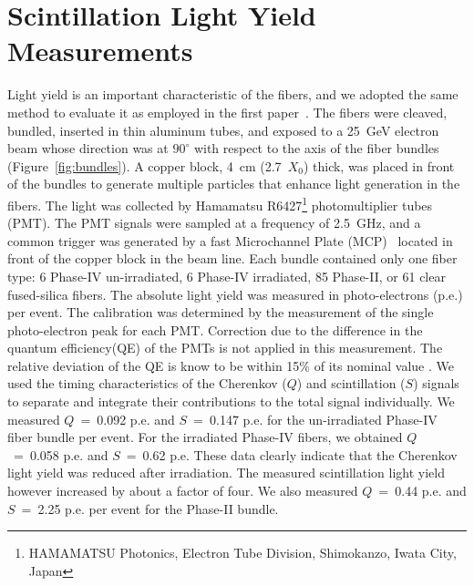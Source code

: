 \documentclass[a4paper,11pt]{article}
\begin{document}
\section{Scintillation Light Yield Measurements}
\label{sec:lightyield}
Light yield is an important characteristic of the fibers, and we adopted the same method to evaluate it as employed in the first paper~\cite{JINSTPaper}.   The fibers were cleaved, bundled, inserted in thin aluminum tubes, and exposed to a 25~GeV electron beam whose direction was at $90^{\circ}$ with respect to the axis of the fiber bundles (Figure~\ref{fig:bundles}). A copper block, 4~cm (2.7~$X_0$) thick, was placed in front of the bundles to generate multiple particles that enhance light generation in the fibers. The light was collected by Hamamatsu R6427\footnote{HAMAMATSU Photonics, Electron Tube Division, Shimokanzo, Iwata City, Japan} photomultiplier tubes (PMT). The PMT signals were sampled at a frequency of 2.5~GHz, and a common trigger was generated by a fast Microchannel Plate (MCP)~\cite{r-MCP} located in front of the copper block in the beam line. Each bundle contained only one fiber type: 6 Phase-IV un-irradiated, 6 Phase-IV irradiated, 85 Phase-II, or 61 clear fused-silica fibers. The absolute light yield was measured in photo-electrons (p.e.) per event. The calibration was determined by the measurement of the single photo-electron peak for each PMT. Correction due to the difference in the quantum efficiency(QE) of the PMTs is not applied in this measurement. The relative deviation of the QE is know to be within 15\% of its nominal value . We used the timing characteristics of the Cherenkov ($Q$) and scintillation ($S$) signals to separate and integrate their contributions to the total signal individually. We measured $Q$~=~0.092 p.e. and $S$~=~0.147 p.e. for the un-irradiated Phase-IV fiber bundle per event. For the irradiated Phase-IV fibers, we obtained $Q$~=~0.058 p.e. and $S$~=~0.62 p.e.  These data clearly indicate that the Cherenkov light yield was reduced after irradiation. The measured scintillation light yield however increased by about a factor of four. We also measured $Q$~=~0.44 p.e. and $S$~=~2.25 p.e. per event for the Phase-II bundle.
\end{document}
